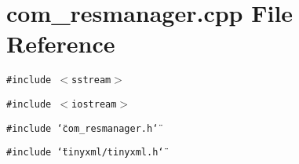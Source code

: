\section{com\_\-resmanager.cpp File Reference}
\label{com__resmanager_8cpp}
{\tt \#include $<$sstream$>$}\par
{\tt \#include $<$iostream$>$}\par
{\tt \#include \char`\"{}com\_\-resmanager.h\char`\"{}}\par
{\tt \#include \char`\"{}tinyxml/tinyxml.h\char`\"{}}\par
